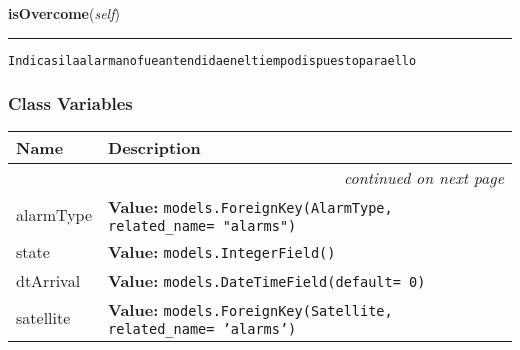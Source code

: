     \label{GroundSegment:models:Alarm:Alarm:Alarm:isOvercome}

    \vspace{0.5ex}

\hspace{.8\funcindent}\begin{boxedminipage}{\funcwidth}

    \raggedright \textbf{isOvercome}(\textit{self})

    \vspace{-1.5ex}

    \rule{\textwidth}{0.5\fboxrule}
\setlength{\parskip}{2ex}
\begin{alltt}

Indica si la alarma no fue antendida en el tiempo dispuesto para ello   
\end{alltt}

\setlength{\parskip}{1ex}
    \end{boxedminipage}



  \subsubsection{Class Variables}

    \vspace{-1cm}
\hspace{\varindent}\begin{longtable}{|p{\varnamewidth}|p{\vardescrwidth}|l}
\cline{1-2}
\cline{1-2} \centering \textbf{Name} & \centering \textbf{Description}& \\
\cline{1-2}
\endhead\cline{1-2}\multicolumn{3}{r}{\small\textit{continued on next page}}\\\endfoot\cline{1-2}
\endlastfoot\raggedright a\-l\-a\-r\-m\-T\-y\-p\-e\- & \raggedright \textbf{Value:} 
{\tt models.ForeignKey(AlarmType, related\_name= "alarms")}&\\
\cline{1-2}
\raggedright s\-t\-a\-t\-e\- & \raggedright \textbf{Value:} 
{\tt models.IntegerField()}&\\
\cline{1-2}
\raggedright d\-t\-A\-r\-r\-i\-v\-a\-l\- & \raggedright \textbf{Value:} 
{\tt models.DateTimeField(default= 0)}&\\
\cline{1-2}
\raggedright s\-a\-t\-e\-l\-l\-i\-t\-e\- & \raggedright \textbf{Value:} 
{\tt models.ForeignKey(Satellite, related\_name= 'alarms')}&\\
\cline{1-2}
\end{longtable}

